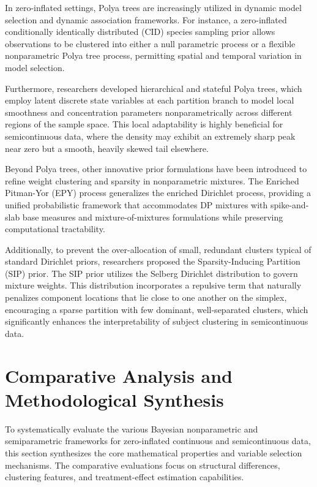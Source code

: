 \documentclass[11pt, a4paper]{article}
\begin{document}
In zero-inflated settings, Polya trees are increasingly utilized in dynamic model selection and dynamic association frameworks.\cite{hanson2002, hanson2006} For instance, a zero-inflated conditionally identically distributed (CID) species sampling prior allows observations to be clustered into either a null parametric process or a flexible nonparametric Polya tree process, permitting spatial and temporal variation in model selection.\cite{hanson2006} 

Furthermore, researchers developed hierarchical and stateful Polya trees, which employ latent discrete state variables at each partition branch to model local smoothness and concentration parameters nonparametrically across different regions of the sample space.\cite{lavine1992} This local adaptability is highly beneficial for semicontinuous data, where the density may exhibit an extremely sharp peak near zero but a smooth, heavily skewed tail elsewhere.\cite{lavine1992}

Beyond Polya trees, other innovative prior formulations have been introduced to refine weight clustering and sparsity in nonparametric mixtures.\cite{miller2018, barrientos2012, ishwaran2001} The Enriched Pitman-Yor (EPY) process generalizes the enriched Dirichlet process, providing a unified probabilistic framework that accommodates DP mixtures with spike-and-slab base measures and mixture-of-mixtures formulations while preserving computational tractability.\cite{barrientos2012, ishwaran2001} 

Additionally, to prevent the over-allocation of small, redundant clusters typical of standard Dirichlet priors, researchers proposed the Sparsity-Inducing Partition (SIP) prior.\cite{miller2018} The SIP prior utilizes the Selberg Dirichlet distribution to govern mixture weights.\cite{miller2018} This distribution incorporates a repulsive term that naturally penalizes component locations that lie close to one another on the simplex, encouraging a sparse partition with few dominant, well-separated clusters, which significantly enhances the interpretability of subject clustering in semicontinuous data.\cite{miller2018}


\section{Comparative Analysis and Methodological Synthesis}

To systematically evaluate the various Bayesian nonparametric and semiparametric frameworks for zero-inflated continuous and semicontinuous data, this section synthesizes the core mathematical properties and variable selection mechanisms. The comparative evaluations focus on structural differences, clustering features, and treatment-effect estimation capabilities.
\end{document}
